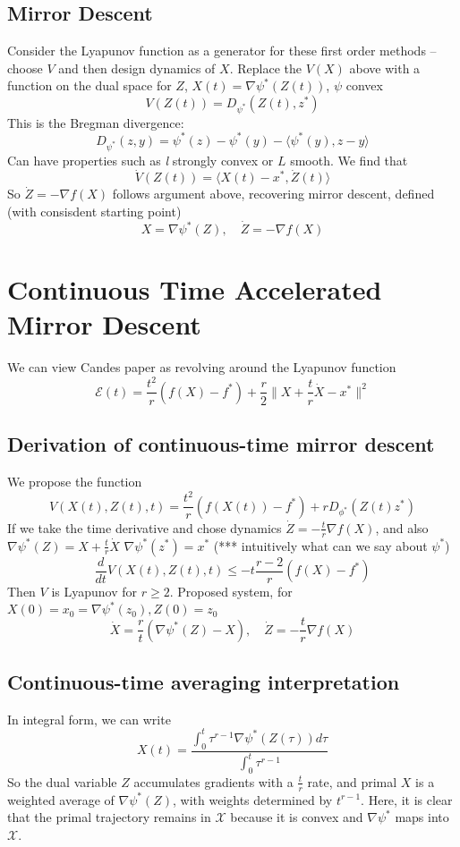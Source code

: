 \documentclass{article}
\begin{document}
\subsection{Mirror Descent}
Consider the Lyapunov function as a generator for these first order methods -- choose $V$ and then design dynamics of $X$. Replace the $V(X)$ above with a function on the dual space for $Z$, $X(t) = \nabla\psi^*(Z(t))$, $\psi$ convex
\[V(Z(t)) = D_{\psi^*} (Z(t), z^*)\]
This is the Bregman divergence: 
\[ D_{\psi^*}(z,y) = \psi^*(z) - \psi^*(y) - \langle \psi^*(y), z-y\rangle \]
Can have properties such as \textit{l} strongly convex or $L$ smooth. We find that
\[\dot V(Z(t)) = \langle  X(t) - x^*, \dot Z(t)\rangle\]
So $\dot Z = -\nabla f(X)$ follows argument above, recovering mirror descent, defined (with consisdent starting point)
\[X = \nabla\psi^*(Z), \quad \dot Z = -\nabla f(X)\]

\section{Continuous Time Accelerated Mirror Descent}
We can view Candes paper as revolving around the Lyapunov function 
\[\mathcal{E}(t) = \frac{t^2}{r} (f(X) - f^*) + \frac{r}{2} \|X+\frac{t}{r}\dot X - x^* \|^2\]

\subsection{Derivation of continuous-time mirror descent}
We propose the function
\[ V(X(t),Z(t),t) = \frac{t^2}{r} (f(X(t)) - f^*) + r D_{\phi^*} (Z(t) z^*) \]
If we take the time derivative and chose dynamics $\dot Z = -\frac{t}{r} \nabla f(X)$, and also $\nabla \psi^*(Z) = X + \frac{t}{r} \dot X$ $\nabla \psi^*(z^*) = x^*$ (*** intuitively what can we say about $\psi^*$)
\[ \frac{d}{dt} V(X(t),Z(t),t) \leq -t \frac{r-2}{r} (f(X) - f^*) \]
Then $V$ is Lyapunov for $r\geq 2$. Proposed system, for $X(0) = x_0 = \nabla \psi^*(z_0), Z(0) = z_0$
\[ \dot X = \frac{r}{t} (\nabla \psi^*(Z) - X),\quad \dot Z = -\frac{t}{r} \nabla f(X) \]

\subsection{Continuous-time averaging interpretation}
In integral form, we can write
\[ X(t) = \frac{\int_0^t \tau^{r-1} \nabla\psi^*(Z(\tau)) d\tau}{\int_0^t \tau^{r-1}} \]
So the dual variable $Z$ accumulates gradients with a $\frac{t}{r}$ rate, and primal $X$ is a weighted average of $\nabla\psi^*(Z)$, with weights determined by $t^{r-1}$. Here, it is clear that the primal trajectory remains in $\mathcal X$ because it is convex and $\nabla\psi^*$ maps into $\mathcal X$.
\end{document}

